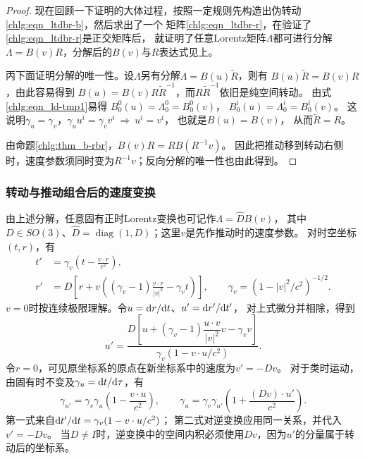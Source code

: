 \begin{proof}
    现在回顾一下证明的大体过程，按照一定规则先构造出伪转动\eqref{chlg:eqn_ltdbr-b}，然后求出了一个
    矩阵\eqref{chlg:eqn_ltdbr-r}，在验证了\eqref{chlg:eqn_ltdbr-r}是正交矩阵后，
    就证明了任意Lorentz矩阵$\Lambda$都可进行分解$\Lambda=B(v)R$，分解后的$B(v)$与$R$表达式见上。

    丙下面证明分解的唯一性。设$\Lambda$另有分解$\Lambda={B}(u)\tilde{R}$，则有
    ${B}(u)\tilde{R}=B(v)R$，由此容易得到
    ${B}(u)=B(v)R\tilde{R}^{-1}$，而$R\tilde{R}^{-1}$依旧是纯空间转动。
    由式\eqref{chlg:eqn_ld-tmp1}易得
    ${B}^{0}_{0}(u)= \Lambda^0_{0}=B^{0}_{0}(v)$，
    ${B}^{i}_{0}(u)= {\Lambda^i_{0}} =B^{i}_{0}(v)$。
    这说明$\gamma_u =\gamma_v$，$\gamma_u u^i=\gamma_v v^i{\  \Rightarrow \  } u^i=v^i$，
    也就是${B}(u) = B(v)$，    从而$\tilde{R}= R$。

    由命题\ref{chlg:thm_b-rbr}，$B(v)R=R B(R^{-1}v)$。
    因此把推动移到转动右侧时，速度参数须同时变为$R^{-1}v$；反向分解的唯一性也由此得到。
\end{proof}

\subsubsection{转动与推动组合后的速度变换}
由上述分解，任意固有正时Lorentz变换也可记作$\Lambda=\widehat D B(v)$，
其中$D\in SO(3)$、$\widehat D=\operatorname{diag}(1,D)$；这里$v$是先作推动时的速度参数。
对时空坐标$(t,r)$，有
\begin{equation}
 \begin{aligned}
 t'&=\gamma_v\left(t-\frac{v\cdot r}{c^2}\right),\\
 r'&=D\left[r+v\left((\gamma_v-1)\frac{v\cdot r}{|v|^2}-\gamma_v t\right)\right],
 \qquad \gamma_v=(1-|v|^2/c^2)^{-1/2}.
 \end{aligned}
\end{equation}
$v=0$时按连续极限理解。令$u=\dd r/\dd t$、$u'=\dd r'/\dd t'$，
对上式微分并相除，得到
\begin{equation}
 u'=\frac{D\left[u+(\gamma_v-1)\dfrac{u\cdot v}{|v|^2}v-\gamma_v v\right]}
 {\gamma_v(1-v\cdot u/c^2)} .
\end{equation}
令$r=0$，可见原坐标系的原点在新坐标系中的速度为$v'=-Dv$。
对于类时运动，由固有时不变及$\gamma_u=\dd t/\dd\tau$，有
\begin{equation}
 \gamma_{u'}=\gamma_v\gamma_u\left(1-\frac{v\cdot u}{c^2}\right),\qquad
 \gamma_u=\gamma_v\gamma_{u'}\left(1+\frac{(Dv)\cdot u'}{c^2}\right).
\end{equation}
第一式来自$\dd t'/\dd t=\gamma_v(1-v\cdot u/c^2)$；
第二式对逆变换应用同一关系，并代入$v'=-Dv$。
当$D\ne I$时，逆变换中的空间内积必须使用$Dv$，因为$u'$的分量属于转动后的坐标系。

